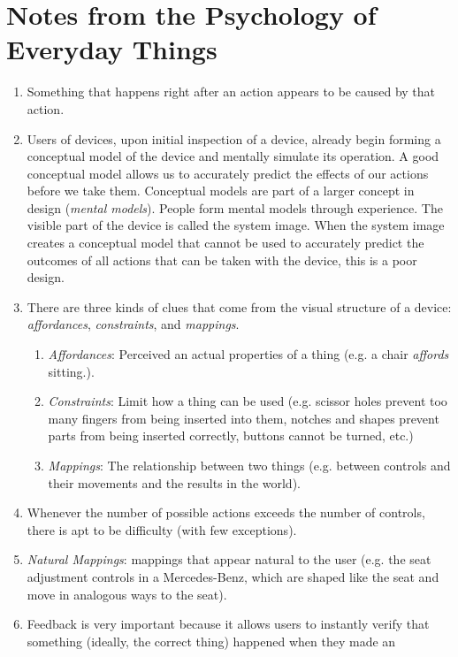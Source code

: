 \documentclass{designdoc}
\begin{document}
\section*{Notes from the Psychology of Everyday Things}
\begin{enumerate}
\item Something that happens right after an action appears to be caused by that
  action.
\item Users of devices, upon initial inspection of a device, already begin
  forming a conceptual model of the device and mentally simulate its operation.
  A good conceptual model allows us to accurately predict the effects of our
  actions before we take them. Conceptual models are part of a larger concept
  in design (\textit{mental models}). People form mental models through
  experience. The visible part of the device is called the system image. When
  the system image creates a conceptual model that cannot be used to accurately
  predict the outcomes of all actions that can be taken with the device, this
  is a poor design.
\item There are three kinds of clues that come from the visual structure of a
  device: \textit{affordances}, \textit{constraints}, and \textit{mappings}.
  \begin{enumerate}
  \item \textit{Affordances}: Perceived an actual properties of a thing (e.g. a
    chair \textit{affords} sitting.).
  \item \textit{Constraints}: Limit how a thing can be used (e.g. scissor holes
    prevent too many fingers from being inserted into them, notches and shapes
    prevent parts from being inserted correctly, buttons cannot be turned,
    etc.)
  \item \textit{Mappings}: The relationship between two things (e.g. between
    controls and their movements and the results in the world).
  \end{enumerate}
\item Whenever the number of possible actions exceeds the number of controls,
  there is apt to be difficulty (with few exceptions).
\item \textit{Natural Mappings}: mappings that appear natural to the user (e.g.
  the seat adjustment controls in a Mercedes-Benz, which are shaped like the
  seat and move in analogous ways to the seat).
\item Feedback is very important because it allows users to instantly verify
  that something (ideally, the correct thing) happened when they made an

\end{enumerate}
\end{document}
